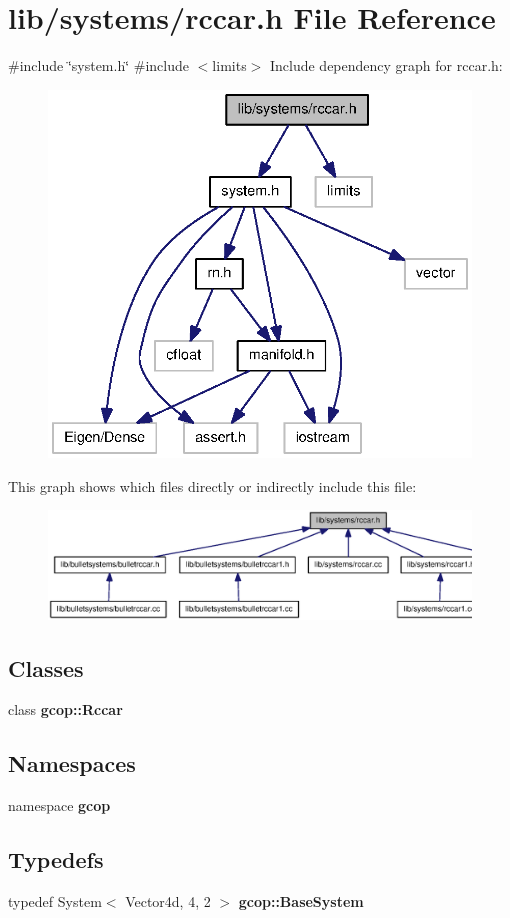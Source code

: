\section{lib/systems/rccar.h \-File \-Reference}
\label{rccar_8h}
{\ttfamily \#include \char`\"{}system.\-h\char`\"{}}\*
{\ttfamily \#include $<$limits$>$}\*
\-Include dependency graph for rccar.\-h\-:
\nopagebreak
\begin{figure}[H]
\begin{center}
\leavevmode
\includegraphics[width=336pt]{rccar_8h__incl}
\end{center}
\end{figure}
\-This graph shows which files directly or indirectly include this file\-:
\nopagebreak
\begin{figure}[H]
\begin{center}
\leavevmode
\includegraphics[width=350pt]{rccar_8h__dep__incl}
\end{center}
\end{figure}
\subsection*{\-Classes}
\begin{DoxyCompactItemize}
\item 
class {\bf gcop\-::\-Rccar}
\end{DoxyCompactItemize}
\subsection*{\-Namespaces}
\begin{DoxyCompactItemize}
\item 
namespace {\bf gcop}
\end{DoxyCompactItemize}
\subsection*{\-Typedefs}
\begin{DoxyCompactItemize}
\item 
typedef \-System$<$ \-Vector4d, 4, 2 $>$ {\bf gcop\-::\-Base\-System}
\end{DoxyCompactItemize}

